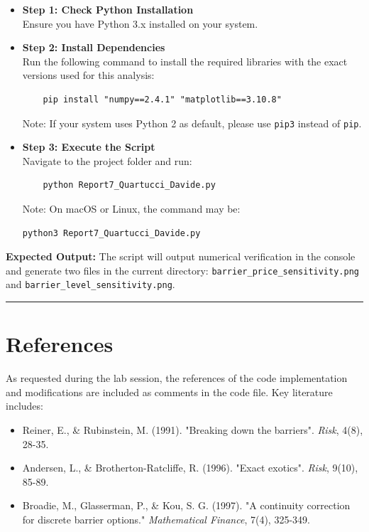 \documentclass{report}
\begin{document}
\begin{itemize}
    \item \textbf{Step 1: Check Python Installation} \\
    Ensure you have Python 3.x installed on your system.
    
    \item \textbf{Step 2: Install Dependencies} \\
    Run the following command to install the required libraries with the exact versions used for this analysis:
    \begin{verbatim}
    pip install "numpy==2.4.1" "matplotlib==3.10.8"
    \end{verbatim}
    Note: If your system uses Python 2 as default, please use \texttt{pip3} instead of \texttt{pip}.

    \item \textbf{Step 3: Execute the Script} \\
    Navigate to the project folder and run:
    \begin{verbatim}
    python Report7_Quartucci_Davide.py
    \end{verbatim}
    Note: On macOS or Linux, the command may be:
    \begin{verbatim}python3 Report7_Quartucci_Davide.py\end{verbatim} 
\end{itemize}
\textbf{Expected Output:} The script will output numerical verification in the console and generate two files in the current directory: \texttt{barrier\_price\_sensitivity.png} and \texttt{barrier\_level\_sensitivity.png}.\\
\rule{\textwidth}{0.4pt}
\section{References}
As requested during the lab session, the references of the code implementation and modifications are included as comments in the code file. Key literature includes:
\begin{itemize}
    \item Reiner, E., \& Rubinstein, M. (1991). "Breaking down the barriers". \textit{Risk}, 4(8), 28-35.
    \item Andersen, L., \& Brotherton-Ratcliffe, R. (1996). "Exact exotics". \textit{Risk}, 9(10), 85-89.
    \item Broadie, M., Glasserman, P., \& Kou, S. G. (1997). "A continuity correction for discrete barrier options." \textit{Mathematical Finance}, 7(4), 325-349.
\end{itemize}
\end{document}
